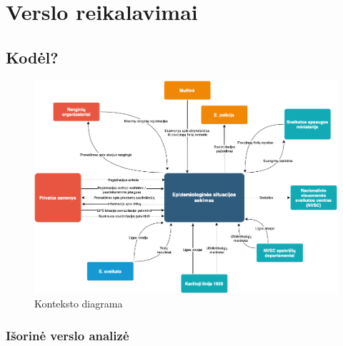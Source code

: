 \documentclass{VUMIFPSkursinis}
\begin{document}
\section{Verslo reikalavimai}

\subsection{Kodėl?}

\begin{figure}[H]
    \centering
    \includegraphics[scale=0.5]{img/context_diagram.png}
    \caption{Konteksto diagrama}
    \label{img:context_diagram}
\end{figure}

\subsubsection{Išorinė verslo analizė}
\end{document}
